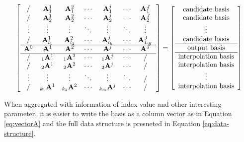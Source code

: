 \documentclass[12pt]{article}
\begin{document}
\begin{equation}
\left[
\begin{array}{ccccccc}
/ & \mathbf{A}^1_1 & \mathbf{A}^2_1 & \cdots & \mathbf{A}^j_1 &\cdots & \mathbf{A}^J_1 \\
/ & \mathbf{A}^1_2 & \mathbf{A}^2_2 & \cdots & \mathbf{A}^j_2 &\cdots & \mathbf{A}^J_2 \\
\vdots & \vdots & \vdots & \ddots & \vdots & \ddots &\vdots   \\
/ &\mathbf{A}^1_{l_1} & \mathbf{A}^2_{l_2} & \cdots & \mathbf{A}^j_{l_h} &\cdots & \mathbf{A}^J_{L_H}\\
\hline
\mathbf{A}^0 & \mathbf{A}^1 & \mathbf{A}^2 & \cdots & \mathbf{A}^j  &\cdots & \mathbf{A}^J\\
\hline
/ &{}_{1}\mathbf{A}^1 & {}_{1}\mathbf{A}^2 & \cdots &{}_{1}\mathbf{A}^j & \cdots & /\\
/ &{}_{2}\mathbf{A}^1 & {}_{2}\mathbf{A}^2 & \cdots &{}_{2}\mathbf{A}^j & \cdots & / \\
\vdots & \vdots & \vdots & \ddots & \vdots  & \ddots & / \\
/ &{}_{k_1}\mathbf{A}^1 & {}_{k_2}\mathbf{A}^2 & \cdots &{}_{k_m}\mathbf{A}^j & \cdots & / \\
\end{array}
\right]
= 
\left[
\begin{array}{c}
\vphantom{A^J_1}\text{candidate basis} \\
\vphantom{A^J_2}\text{candidate basis} \\
\vphantom{\vdots} \vdots \\
\vphantom{A^J_{L_H}}\text{candidate basis} \\
\hline
\vphantom{A^J}\text{output basis} \\
\hline
\vphantom{\text{NULL}}\text{interpolation basis} \\
\vphantom{\text{NULL}}\text{interpolation basis} \\
\vphantom{\text{NULL}}\vdots \\
\vphantom{\text{NULL}}\text{interpolation basis} \\
\end{array}
\right]
\label{eq:matrixA}
\end{equation}

When aggregated with information of index value and other interesting
parameter, it is easier to write the basis as a column vector as in
Equation \ref{eq:vectorA} and the full data structure is presneted in
Equation \ref{eq:data-structure}.
\end{document}
